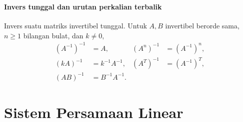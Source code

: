 \documentclass{../../kalkulus-ppt}
\begin{document}
\begin{frame}
    \frametitle{\insertsection}
    \framesubtitle{Invers tunggal dan urutan perkalian terbalik}
    \begin{teorema}
        Invers suatu matriks invertibel tunggal. Untuk $A,B$ invertibel berorde sama,
        $n\ge1$ bilangan bulat, dan $k\ne0$,
        \[
            \begin{aligned}
                (A^{-1})^{-1}&=A, & (A^n)^{-1}&=(A^{-1})^n,\\
                (kA)^{-1}&=k^{-1}A^{-1}, & (A^T)^{-1}&=(A^{-1})^T,\\
                (AB)^{-1}&=B^{-1}A^{-1}. &&
            \end{aligned}
        \]
    \end{teorema}
\end{frame}

\section{Sistem Persamaan Linear}
\end{document}

